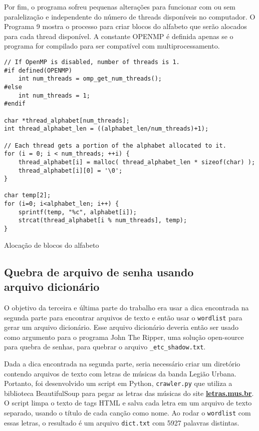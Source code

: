 \documentclass{sig-alternate-05-2015}
\begin{document}
Por fim, o programa sofreu pequenas alterações para funcionar com ou sem paralelização e independente do número de threads disponíveis no computador.
O Programa 9 mostra o processo para criar blocos do alfabeto que serão alocados para cada thread disponível.
A constante OPENMP é definida apenas se o programa for compilado para ser compatível com multiprocessamento.

\begin{program}
\begin{lstlisting}
// If OpenMP is disabled, number of threads is 1.
#if defined(OPENMP)
    int num_threads = omp_get_num_threads();
#else
    int num_threads = 1;
#endif

char *thread_alphabet[num_threads];
int thread_alphabet_len = ((alphabet_len/num_threads)+1);

// Each thread gets a portion of the alphabet allocated to it. 
for (i = 0; i < num_threads; ++i) {
    thread_alphabet[i] = malloc( thread_alphabet_len * sizeof(char) );
    thread_alphabet[i][0] = '\0';
}

char temp[2];
for (i=0; i<alphabet_len; i++) {
    sprintf(temp, "%c", alphabet[i]);
    strcat(thread_alphabet[i % num_threads], temp);
}\end{lstlisting}
\caption{Alocação de blocos do alfabeto}
\end{program}

\subsection{Quebra de arquivo de senha usando\\ arquivo dicionário}

O objetivo da terceira e última parte do trabalho era usar a dica encontrada na segunda parte para encontrar arquivos de texto e então usar o \texttt{wordlist} para gerar um arquivo dicionário.
Esse arquivo dicionário deveria então ser usado como argumento para o programa John The Ripper, uma solução open-source para quebra de senhas, para quebrar o arquivo \texttt{\_etc\_shadow.txt}.

Dada a dica encontrada na segunda parte, seria necessário criar um diretório contendo arquivos de texto com letras de músicas da banda Legião Urbana.
Portanto, foi desenvolvido um script em Python, \texttt{crawler.py} que utiliza a biblioteca BeautifulSoup para pegar as letras das músicas do site \textbf{\url{letras.mus.br}}.
O script limpa o texto de tags HTML e salva cada letra em um arquivo de texto separado, usando o título de cada canção como nome.
Ao rodar o \texttt{wordlist} com essas letras, o resultado é um arquivo \texttt{dict.txt} com 5927 palavras distintas.
\end{document}

